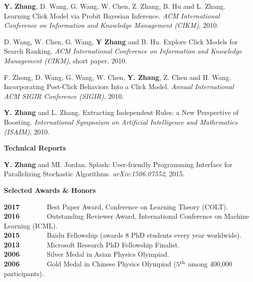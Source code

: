\documentclass{res}
\begin{document}
\begin{resume}
\begin{enumerate}[label={[C\arabic*]}, ref={C\arabic*}]
\item \textbf{Y. Zhang}, D. Wang, G. Wang, W. Chen, Z. Zhang, B. Hu and L. Zhang. Learning Click Model via Probit Bayesian Inference.
\emph{ACM International Conference on Information and Knowledge Management (CIKM)}, 2010. \label{learning-cikm10}

\item D. Wang, W. Chen, G. Wang, \textbf{Y Zhang} and B. Hu. Explore Click Models for Search Ranking.
\emph{ACM International Conference on Information and Knowledge Management (CIKM)}, short paper, 2010. \label{explore-cikm10}

\item F. Zhong, D. Wang, G. Wang, W. Chen, \textbf{Y. Zhang}, Z. Chen and H. Wang. Incorporating Post-Click Behaviors Into a Click Model.
\emph{Annual International ACM SIGIR Conference (SIGIR)}, 2010. \label{incorporating-sigir10}

\item \textbf{Y. Zhang} and L. Zhang. Extracting Independent Rules: a New Perspective of Boosting. 
\emph{International Symposium on Artificial Intelligence and Mathematics (ISAIM)}, 2010. \label{a-new-isaim10}
\end{enumerate}

{\bf\Large Technical Reports}
\vspace{5pt}

\begin{enumerate}[label={[T\arabic*]}, ref={T\arabic*}]
\item \label{splash}\textbf{Y. Zhang} and MI. Jordan. Splash: User-friendly Programming Interface for Parallelizing Stochastic Algorithms. \emph{arXiv:1506.07552}, 2015.
\end{enumerate}

{\Large\bf Selected Awards \& Honors}

\vspace{-5pt}
\textbf{2017}~~~~~~~~Best Paper Award, Conference on Learning Theory (COLT).\\
\textbf{2016}~~~~~~~~Outstanding Reviewer Award, International Conference on Machine Learning (ICML).\\
\textbf{2015}~~~~~~~~Baidu Fellowship (awards 8 PhD students every year worldwide).\\
\textbf{2013}~~~~~~~~Microsoft Research PhD Fellowship Finalist.\\
\textbf{2006}~~~~~~~~Silver Medal in Asian Physics Olympiad.\\
\textbf{2006}~~~~~~~~Gold Medal in Chinese Physics Olympiad ($5^{\rm{th}}$ among 400,000 participants).


\end{resume}
\end{document}

